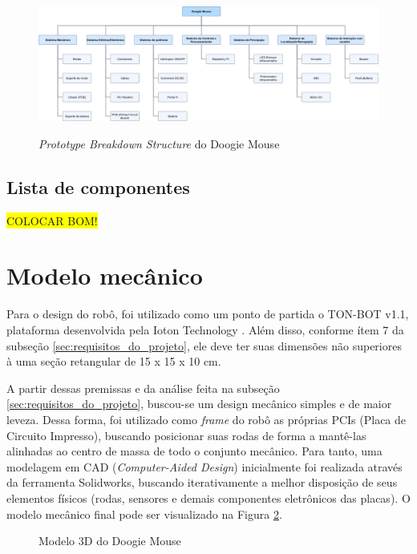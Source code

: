 \begin{figure}[H]
	\centering
	\caption{\textit{Prototype Breakdown Structure} do Doogie Mouse}
	\includegraphics[width=1\textwidth]
	{Figures/prototype_breakdown_structure}
	\label{fig:pbs}
\end{figure}

\subsection{Lista de componentes}
\label{ssec:bom}
\colorbox{yellow}{COLOCAR BOM!}


\section{Modelo mecânico}
\label{sec:modelo_mecanico}
Para o design do robô, foi utilizado como um ponto de partida o TON-BOT v1.1, plataforma desenvolvida pela Ioton Technology \cite{teste}. Além disso, conforme ítem 7 da subseção \ref{sec:requisitos_do_projeto}, ele deve ter suas dimensões não superiores à uma seção retangular de 15 x 15 x 10 cm.

A partir dessas premissas e da análise feita na subseção \ref{sec:requisitos_do_projeto}, buscou-se um design mecânico simples e de maior leveza. Dessa forma, foi utilizado como \textit{frame} do robô as próprias PCIs (Placa de Circuito Impresso), buscando posicionar suas rodas de forma a mantê-las alinhadas ao centro de massa de todo o conjunto mecânico. Para tanto, uma modelagem em CAD (\textit{Computer-Aided Design}) inicialmente foi realizada através da ferramenta Solidworks, buscando iterativamente a melhor disposição de seus elementos físicos (rodas, sensores e demais componentes eletrônicos das placas).  O modelo mecânico final pode ser visualizado na Figura \ref{fig:doogie_boards_3d}.

\begin{figure}[H]
	\centering
	\caption{Modelo 3D do Doogie Mouse}
	\label{fig:doogie_boards_3d}
\end{figure}

